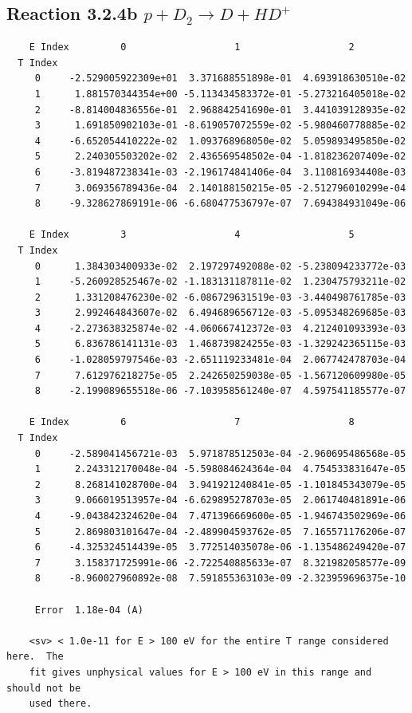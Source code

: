 \documentclass[12pt,dvipdfmx]{article}
\begin{document}
\newpage
\subsection{
Reaction 3.2.4b $  p + D_2 \rightarrow D + HD^+$}


\begin{small}\begin{verbatim}
    E Index         0                   1                   2
  T Index
     0     -2.529005922309e+01  3.371688551898e-01  4.693918630510e-02
     1      1.881570344354e+00 -5.113434583372e-01 -5.273216405018e-02
     2     -8.814004836556e-01  2.968842541690e-01  3.441039128935e-02
     3      1.691850902103e-01 -8.619057072559e-02 -5.980460778885e-02
     4     -6.652054410222e-02  1.093768968050e-02  5.059893495850e-02
     5      2.240305503202e-02  2.436569548502e-04 -1.818236207409e-02
     6     -3.819487238341e-03 -2.196174841406e-04  3.110816934408e-03
     7      3.069356789436e-04  2.140188150215e-05 -2.512796010299e-04
     8     -9.328627869191e-06 -6.680477536797e-07  7.694384931049e-06

    E Index         3                   4                   5
  T Index
     0      1.384303400933e-02  2.197297492088e-02 -5.238094233772e-03
     1     -5.260928525467e-02 -1.183131187811e-02  1.230475793211e-02
     2      1.331208476230e-02 -6.086729631519e-03 -3.440498761785e-03
     3      2.992464843607e-02  6.494689656712e-03 -5.095348269685e-03
     4     -2.273638325874e-02 -4.060667412372e-03  4.212401093393e-03
     5      6.836786141131e-03  1.468739824255e-03 -1.329242365115e-03
     6     -1.028059797546e-03 -2.651119233481e-04  2.067742478703e-04
     7      7.612976218275e-05  2.242650259038e-05 -1.567120609980e-05
     8     -2.199089655518e-06 -7.103958561240e-07  4.597541185577e-07

    E Index         6                   7                   8
  T Index
     0     -2.589041456721e-03  5.971878512503e-04 -2.960695486568e-05
     1      2.243312170048e-04 -5.598084624364e-04  4.754533831647e-05
     2      8.268141028700e-04  3.941921240841e-05 -1.101845343079e-05
     3      9.066019513957e-04 -6.629895278703e-05  2.061740481891e-06
     4     -9.043842324620e-04  7.471396669600e-05 -1.946743502969e-06
     5      2.869803101647e-04 -2.489904593762e-05  7.165571176206e-07
     6     -4.325324514439e-05  3.772514035078e-06 -1.135486249420e-07
     7      3.158371725991e-06 -2.722540885633e-07  8.321982058577e-09
     8     -8.960027960892e-08  7.591855363103e-09 -2.323959696375e-10

     Error  1.18e-04 (A)

    <sv> < 1.0e-11 for E > 100 eV for the entire T range considered here.  The
    fit gives unphysical values for E > 100 eV in this range and should not be
    used there.
\end{verbatim}\end{small}
\end{document}
